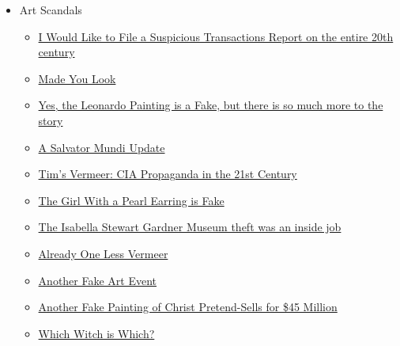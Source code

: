 \documentclass{article}
\newcommand{\insertmydocument}[2]{ %
  \item \href{http://www.mileswmathis.com/#2}{#1}
}
\begin{document}
\begin{itemize}
\begin{itemize}
    \item Art Scandals
    \begin{itemize}

      \insertmydocument{I Would Like to File a Suspicious Transactions Report on the entire 20th century}{launder.pdf}
      \insertmydocument{Made You Look}{madeyou.pdf}
      \insertmydocument{Yes, the Leonardo Painting is a Fake, but there is so much more to the story}{davinci.pdf}
      \insertmydocument{A Salvator Mundi Update}{mundi2.pdf}
      \insertmydocument{Tim's Vermeer: CIA Propaganda in the 21st Century}{vermeer.pdf}
      \insertmydocument{The Girl With a Pearl Earring is Fake}{pearl.pdf}
      \insertmydocument{The Isabella Stewart Gardner Museum theft was an inside job}{isgm.pdf}
      \insertmydocument{Already One Less Vermeer}{verm2.pdf}
      \insertmydocument{Another Fake Art Event}{gill.pdf}
      \insertmydocument{Another Fake Painting of Christ Pretend-Sells for \$45 Million}{botti.pdf}
      \insertmydocument{Which Witch is Which?}{chigi.pdf}
    \end{itemize}
  \end{itemize}
\end{itemize}
\end{document}

